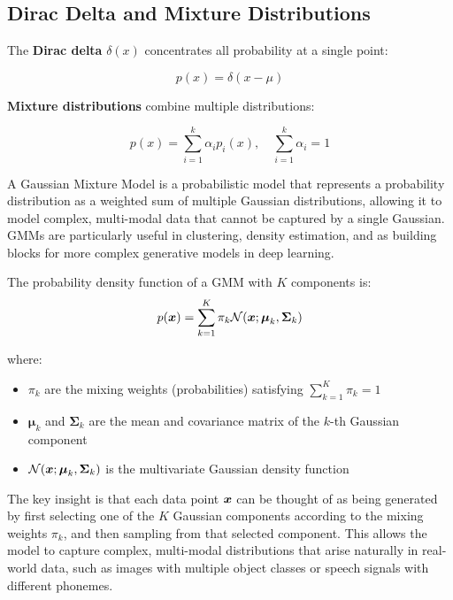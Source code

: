 \subsection{Dirac Delta and Mixture Distributions}

The \textbf{Dirac delta} $\delta(x)$ concentrates all probability at a single point:

\begin{equation}
p(x) = \delta(x - \mu)
\end{equation}

\textbf{Mixture distributions} combine multiple distributions:

\begin{equation}
p(x) = \sum_{i=1}^{k} \alpha_i p_i(x), \quad \sum_{i=1}^{k} \alpha_i = 1
\end{equation}

\begin{example}
A Gaussian Mixture Model is a probabilistic model that represents a probability distribution as a weighted sum of multiple Gaussian distributions, allowing it to model complex, multi-modal data that cannot be captured by a single Gaussian. GMMs are particularly useful in clustering, density estimation, and as building blocks for more complex generative models in deep learning.

The probability density function of a GMM with $K$ components is:
\begin{equation}
p(\boldsymbol{x}) = \sum_{k=1}^{K} \pi_k \mathcal{N}(\boldsymbol{x}; \boldsymbol{\mu}_k, \boldsymbol{\Sigma}_k)
\end{equation}

where:
\begin{itemize}
    \item $\pi_k$ are the mixing weights (probabilities) satisfying $\sum_{k=1}^{K} \pi_k = 1$
    \item $\boldsymbol{\mu}_k$ and $\boldsymbol{\Sigma}_k$ are the mean and covariance matrix of the $k$-th Gaussian component
    \item $\mathcal{N}(\boldsymbol{x}; \boldsymbol{\mu}_k, \boldsymbol{\Sigma}_k)$ is the multivariate Gaussian density function
\end{itemize}

The key insight is that each data point $\boldsymbol{x}$ can be thought of as being generated by first selecting one of the $K$ Gaussian components according to the mixing weights $\pi_k$, and then sampling from that selected component. This allows the model to capture complex, multi-modal distributions that arise naturally in real-world data, such as images with multiple object classes or speech signals with different phonemes.
\end{example}

